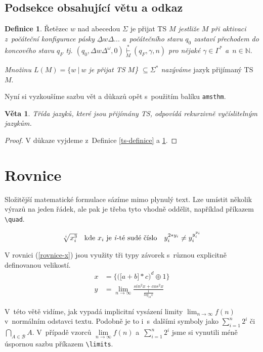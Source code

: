 \documentclass[twocolumn, 11pt, a4paper]{article}
\theoremstyle{definition}
\newtheorem{definice}{Definice}
\theoremstyle{plain}
\newtheorem{veta}{Věta}
\begin{document}
\subsection{Podsekce obsahující větu a odkaz}
\begin{definice}
\label{def-jazyk}
Řetězec $w$ nad abecedou $\Sigma$ je přijat TS \emph{$M$ jestliže $M$ při aktivaci z~počáteční konfigurace pásky} $\underline \Delta w \Delta ...$ \emph{a~počátečního stavu $q_0$ zastaví přechodem do koncového stavu $q_F$ tj. $(q_0, \Delta w \Delta^{\omega}, 0) \overset{*}{\underset{M}{\vdash}} (q_F, \gamma, n)$ pro nějaké $\gamma \in \Gamma^*$ a~$n \in \mathbb{N}$}.
\par
\emph{Množinu $L(M) = \{w\:|\:w$ je přijat TS $M$\} $\subseteq \Sigma^*$ nazýváme} jazyk přijímaný TS $M$. 
\end{definice}
\par
Nyní si vyzkoušíme sazbu vět a důkazů opět s~použitím balíku \texttt{amsthm}.
\par
\begin{veta}
Třída jazyků, které jsou přijímány TS, odpovídá \emph{rekurzivně vyčíslitelným jazykům.}
\end{veta}
\begin{proof}
V důkaze vyjdeme z~Definice \ref{ts-definice} a \ref{def-jazyk}.
\end{proof}
\section{Rovnice}
Složitější matematické formulace sázíme mimo plynulý text. Lze umístit několik výrazů na jeden řádek, ale pak je třeba tyto vhodně oddělit, například příkazem \verb|\quad|.
\par
$$\begin{array}{ccc}
    \sqrt[i]{x^3_i} & \text{kde } x_i \text{ je \emph{i}-té sudé číslo} & y^{2*y_i}_i \neq y_i^{y_i^{y_i}}
\end{array}$$
\par
V rovnici (\ref{rovnice-x}) jsou využity tři typy závorek s~různou explicitně definovanou velikostí.
\begin{align}
    x & = \bigg\{ \Big( \big[ a+b \big] *c \Big) ^d \oplus 1\bigg\} \label{rovnice-x} \\
    y & = \lim \limits _{n \rightarrow \infty} \frac{sin^2 x + cos^2 x}{\frac{1}{log_{10} x}} \label{rovnice-y}
\end{align} 
\par
V~této větě vidíme, jak vypadá implicitní vysázení limity $\lim _{n \rightarrow \infty} f(n)$ v~normálním odstavci textu. Podobně je to i~s~dalšími symboly jako $\sum_{i=1}^n 2^i$ či $\bigcap_{A\in \mathcal{B}} A$. V~případě vzorců $\lim\limits _{n \rightarrow \infty} f(n)$ a~$\sum\limits _{i=1}^n 2^i$ jsme si vynutili méně úspornou sazbu příkazem \verb|\limits|.
\end{document}
